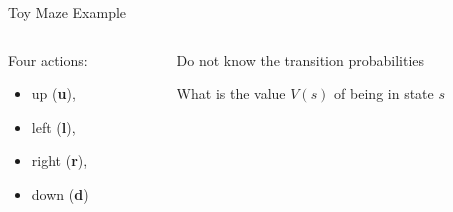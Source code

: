 \documentclass[11pt,table]{beamer}
\begin{document}
\begin{frame}{Toy Maze Example}
\vspace{6mm}
\centering
\begin{columns}
\begin{column}{0.4\textwidth}

Four actions:
\begin{itemize}
	\item up (\textbf{u}),
	\item left (\textbf{l}),
	\item right (\textbf{r}),
	\item down (\textbf{d})
\end{itemize}
\end{column}
\begin{column}{0.6\textwidth}
Do not know the transition probabilities

\vspace{3mm}
  \textcolor{red1}{What is the value $V(s)$ of being in state $s$}
\end{column}
\end{columns}
    
\end{frame}
\end{document}
